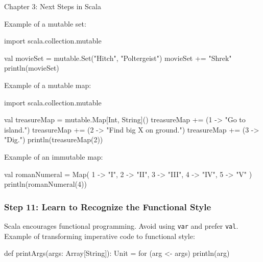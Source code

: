 \begin{notes}{Chapter 3: Next Steps in Scala}
\begin{highlight}
    \end{highlight}

    Example of a mutable set:

    \begin{highlight}

    \begin{code}[Scala]
    import scala.collection.mutable

    val movieSet = mutable.Set("Hitch", "Poltergeist")
    movieSet += "Shrek"
    println(movieSet)
    \end{code}

    \end{highlight}

    Example of a mutable map:

    \begin{highlight}

    \begin{code}[Scala]
    import scala.collection.mutable

    val treasureMap = mutable.Map[Int, String]()
    treasureMap += (1 -> "Go to island.")
    treasureMap += (2 -> "Find big X on ground.")
    treasureMap += (3 -> "Dig.")
    println(treasureMap(2))
    \end{code}

    \end{highlight}

    Example of an immutable map:

    \begin{highlight}
    \begin{code}[Scala]
    val romanNumeral = Map(
        1 -> "I", 2 -> "II", 3 -> "III", 4 -> "IV", 5 -> "V"
    )
    println(romanNumeral(4))
    \end{code}

    \end{highlight}

    \subsubsection*{Step 11: Learn to Recognize the Functional Style}

    Scala encourages functional programming. Avoid using \texttt{var} and prefer \texttt{val}. Example of transforming imperative code to functional style:

    \begin{highlight}

    \begin{code}[Scala]
    def printArgs(args: Array[String]): Unit = {
        for (arg <- args)
            println(arg)
    }


\end{code}
\end{highlight}
\end{notes}
